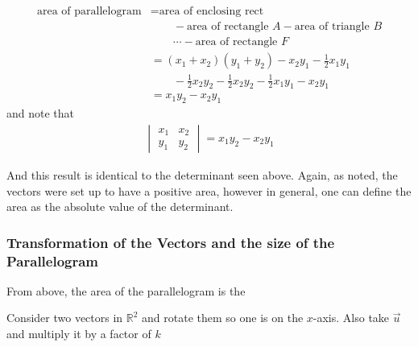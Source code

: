 \begin{align*}
\text{area of parallelogram} & = \text{area of enclosing rect} \\
& \qquad - \text{area of rectangle $A$} - \text{area of triangle $B$} \\
& \qquad \cdots - \text{area of rectangle $F$} \\
& =
(x_1+x_2)(y_1+y_2) - x_2 y_1 - \frac{1}{2} x_1 y_1 \\
& \qquad - \frac{1}{2} x_2 y_2 - \frac{1}{2} x_2 y_2 - \frac{1}{2} x_1 y_1 - x_2 y_1 \\
& = x_1 y_2 - x_2 y_1
\end{align*}
and note that
%
\begin{align*}
\begin{vmatrix}
x_1 & x_2 \\
y_1 & y_2
\end{vmatrix} = x_1 y_2 - x_2 y_1
\end{align*}

And this result is identical to the determinant seen above.  Again, as noted, the vectors were set up to have a positive area, however in general, one can define the area as the absolute value of the determinant.


\subsubsection{Transformation of the Vectors and the size of the Parallelogram}

From above, the area of the parallelogram is the

Consider two vectors in $\mathbb{R}^2$ and rotate them so one is on the $x$-axis.   Also take $\vec{u}$ and multiply it by a factor of $k$


\begin{center}

\end{center}

